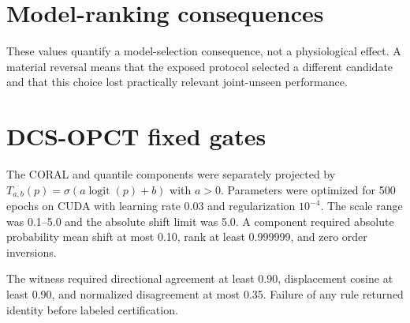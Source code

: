 \documentclass[preprint,12pt]{elsarticle}
\begin{document}
\section{Model-ranking consequences}

\begin{table}[h]
\centering
\caption{Selected model-ranking consequences under subject exposure. Rates are proportions across five split seeds. Regret is joint-unseen balanced accuracy.}
\small
{}
\end{table}

These values quantify a model-selection consequence, not a physiological effect. A material reversal means that the exposed protocol selected a different candidate and that this choice lost practically relevant joint-unseen performance.

\section{DCS-OPCT fixed gates}

The CORAL and quantile components were separately projected by $T_{a,b}(p)=\sigma(a\operatorname{logit}(p)+b)$ with $a>0$. Parameters were optimized for 500 epochs on CUDA with learning rate 0.03 and regularization $10^{-4}$. The scale range was 0.1--5.0 and the absolute shift limit was 5.0. A component required absolute probability mean shift at most 0.10, rank at least 0.999999, and zero order inversions.

The witness required directional agreement at least 0.90, displacement cosine at least 0.90, and normalized disagreement at most 0.35. Failure of any rule returned identity before labeled certification.
\end{document}
